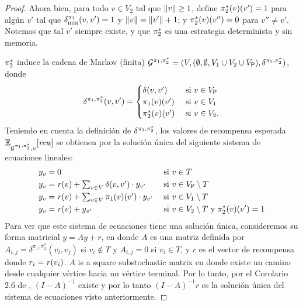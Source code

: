 \begin{proof}
  Ahora bien,  para todo $v\in V_2$
  tal que ${\lVert{v}\rVert} \geq 1$, define $\pi^*_{2}(v)(v')=1$
  para algún $v'$ tal que $\delta^{\pi_{1}}_{\min}(v,v')=1$ y
  ${\lVert{v}\rVert}={\lVert{v'}\rVert}+1$; y $\pi^*_{2}(v)(v'')=0$ para $v''\neq v'$.  Notemos que tal $v'$ siempre existe,
  y que $\pi^*_{2}$ es una estrategia determinista y sin memoria.

  $\pi^*_{2}$ induce la cadena de Markov (finita)
  $\mathcal{G}^{\pi_{1},\pi^*_{2}} = (V, (\emptyset,\emptyset,V_1\cup V_2\cup V_{\mathsf{P}}),\delta^{\pi_{1},\pi^*_{2}})$,
  donde
  \[\delta^{\pi_{1},\pi^*_{2}}(v,v') =
    \begin{cases}
      \delta(v,v')     & \text{ si } v\in V_{\mathsf{P}} \\
      \pi_{1}(v)(v') & \text{ si } v\in V_1 \\
      \pi^*_{2}(v)(v') & \text{ si } v\in V_2.
    \end{cases}
  \]
  Teniendo en cuenta la definición de $\delta^{\pi_{1},\pi^*_{2}}$,
  los valores de recompensa esperada
  $\mathbb{E}^{}_{\mathcal{G}^{\pi_{1},\pi^*_{2}},v}[\textit{rew}]$ se obtienen
  por la solución única del siguiente sistema de ecuaciones lineales:
  \begin{align*}
    y_v = {} & 0 && \text{ si } v\in T \\
    y_v = {} &\textstyle \mathit{r}(v) + \sum_{v\in V} \delta(v,v') \cdot y_{v'} && \text{ si } v\in V_{\mathsf{P}} \setminus T\\
    y_v = {} &\textstyle \mathit{r}(v) + \sum_{v\in V} \pi_{1}(v)(v') \cdot y_{v'}  && \text{ si } v\in V_1 \setminus T\\
    y_v = {} & \mathit{r}(v) +  y_{v'} && \text{ si } v\in V_2 \setminus T \text{ y } \pi^*_{2}(v)(v') = 1
  \end{align*}
  Para ver que este sistema de ecuaciones tiene una solución única, consideremos su forma matricial $y = Ay+ r$, en donde $A$ es una matriz definida por
  $A_{i,j} = \delta^{\pi_1,\pi^*_2}(v_i,v_j)$ si $v_i \notin T$ y
  $A_{i,j} = 0$ si $v_i \in T$, y $r$ es el vector de recompensa donde
  $r_i = \mathit{r}(v_i)$.
  $A$ is a square substochastic matrix
  \cite{DBLP:journals/moc/Azimzadeh19} en donde existe un camino desde cualquier vértice hacia un vértice terminal.
  Por lo tanto, por el Corolario 2.6 de \cite{DBLP:journals/moc/Azimzadeh19},
  $(I-A)^{-1}$ existe y por lo tanto $(I-A)^{-1} r$ es la solución única del sistema de ecuaciones visto anteriormente.


\end{proof}
